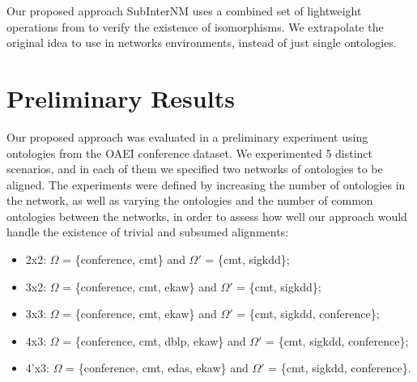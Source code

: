 \documentclass{llncs}
\begin{document}
Our proposed approach SubInterNM uses a combined set of lightweight operations from \cite{casanova2012operations} to verify the existence of isomorphisms. We extrapolate the original idea to use in networks environments, instead of just single ontologies.

\section{Preliminary Results} \label{sec:results}   

Our proposed approach was evaluated in a preliminary experiment using ontologies from the OAEI conference dataset. We experimented 5 distinct scenarios, and in each of them we specified two networks of ontologies to be aligned. The experiments were defined by increasing  the number of ontologies in the network, as well as varying the ontologies and the number of common ontologies between the networks, in order to assess how well our approach would handle the existence of trivial and subsumed alignments:
\begin{itemize}
  \item 2x2: $\Omega$ = \{conference, cmt\} and $\Omega'$ = \{cmt, sigkdd\};
\item 3x2: $\Omega$ = \{conference, cmt, ekaw\} and $\Omega'$ = \{cmt, sigkdd\};
\item 3x3: $\Omega$ = \{conference, cmt, ekaw\} and $\Omega'$ = \{cmt, sigkdd, conference\};
\item 4x3: $\Omega$ = \{conference, cmt, dblp, ekaw\} and $\Omega'$ = \{cmt, sigkdd, conference\}; 
\item 4'x3: $\Omega$ = \{conference, cmt, edas, ekaw\} and $\Omega'$ = \{cmt, sigkdd, conference\}. 
\end{itemize}
 
\end{document}

